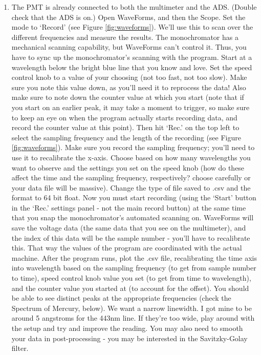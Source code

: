 \documentclass{../lab}
\begin{document}
\begin{enumerate}
    \item The PMT is already connected to both the multimeter and the ADS. (Double check that the ADS is on.) Open WaveForms, and then the Scope. Set the mode to `Record' (see Figure \ref{fig:waveforms}). We'll use this to scan over the different frequencies and measure the results. The monochromator has a mechanical scanning capability, but WaveForms can't control it.  Thus, you have to sync up the monochromator's scanning with the program. Start at a wavelength below the bright blue line that you know and love. Set the speed control knob to a value of your choosing (not too fast, not too slow). Make sure you note this value down, as you'll need it to reprocess the data! Also make sure to note down the counter value at which you start (note that if you start on an earlier peak, it may take a moment to trigger, so make sure to keep an eye on when the program actually starts recording data, and record the counter value at this point). Then hit `Rec.' on the top left to select the sampling frequency and the length of the recording (see Figure \ref{fig:waveforms}). Make sure you record the sampling frequency; you'll need to use it to recalibrate the x-axis. Choose based on how many wavelengths you want to observe and the settings you set on the speed knob (how do these affect the time and the sampling frequency, respectively? choose carefully or your data file will be massive). Change the type of file saved to .csv and the format to 64 bit float. Now you must start recording (using the `Start' button in the `Rec.' settings panel - not the main record button) at the same time that you snap the monochromator's automated scanning on. WaveForms will save the voltage data (the same data that you see on the multimeter), and the index of this data will be the sample number - you'll have to recalibrate this. That way the values of the program are coordinated with the actual machine. After the program runs, plot the .csv file, recalibrating the time axis into wavelength based on the sampling frequency (to get from sample number to time), speed control knob value you set (to get from time to wavelength), and the counter value you started at (to account for the offset). You should be able to see distinct peaks at the appropriate frequencies (check the Spectrum of Mercury, below). We want a narrow linewidth. I got mine to be around 5 angstroms for the 443nm line. If they're too wide, play around with the setup and try and improve the reading. You may also need to smooth your data in post-processing - you may be interested in the Savitzky-Golay filter.%

\end{enumerate}
\end{document}
